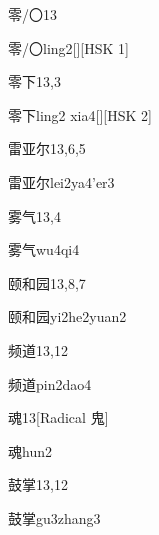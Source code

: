 \begin{entry}{零/〇}{13}
  \begin{phonetics}{零/〇}{ling2}[][HSK 1]
  \end{phonetics}
\end{entry}

\begin{entry}{零下}{13,3}
  \begin{phonetics}{零下}{ling2 xia4}[][HSK 2]
  \end{phonetics}
\end{entry}

\begin{entry}{雷亚尔}{13,6,5}
  \begin{phonetics}{雷亚尔}{lei2ya4'er3}
  \end{phonetics}
\end{entry}

\begin{entry}{雾气}{13,4}
  \begin{phonetics}{雾气}{wu4qi4}
  \end{phonetics}
\end{entry}

\begin{entry}{颐和园}{13,8,7}
  \begin{phonetics}{颐和园}{yi2he2yuan2}
  \end{phonetics}
\end{entry}

\begin{entry}{频道}{13,12}
  \begin{phonetics}{频道}{pin2dao4}
  \end{phonetics}
\end{entry}

\begin{entry}{魂}{13}[Radical 鬼]
  \begin{phonetics}{魂}{hun2}
  \end{phonetics}
\end{entry}

\begin{entry}{鼓掌}{13,12}
  \begin{phonetics}{鼓掌}{gu3zhang3}
  \end{phonetics}
\end{entry}


